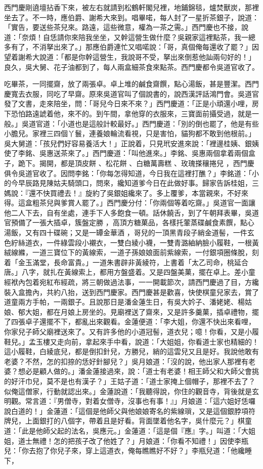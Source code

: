 西門慶剛遶壇拈香下來，被左右就請到松鶴軒閣兒裡，地鋪錦毯，爐焚獸炭，那裡坐去了。不一時，應伯爵、謝希大來到。唱畢喏，每人封了一星折茶銀子，說道：「實告，要送些茶兒來。路遠，這些微意，權為一茶之需。」西門慶也不接，說道：「奈煩！自恁請你來陪我坐坐，又幹這營生做什麼？吳親家這裡點茶，我一總多有了，不消拏出來了。」那應伯爵連忙又唱喏說：「哥，真個俺每還收了罷？」因望着謝希大說道：「都是你幹這營生，我說哥不受，拏出來倒惹他訕兩句好的！」良久，吳大舅、花子油都到了，每人兩盒細茶食來點茶。西門慶都令吳道官收了。

吃畢茶，一同擺齋，放了兩張卓。卓上堆的鹹食齋饌，點心湯飯，甚是豐潔。西門慶寬去衣服，同吃了早齋。原來吳道官叫了個說書的，說西漢評話鴻門會。吳道官發了文書，走來陪坐，問：「哥兒今日來不來？」西門慶道：「正是小頑還小哩，房下恐怕路遠諕着他，來不的。到午間，拿他穿的衣服來，三寶面前攝受過，就是一般。」吳道官道：「小道也是這般計較最好。」西門慶道：「別的倒也罷了，他是有些小膽兒。家裡三四個丫鬟，連養娘輪流看視，只是害怕，貓狗都不敢到他根前。」吳大舅道：「孩兒們好容易養活大！」正說着，只見玳安進來說：「裡邊桂姨、銀姨使了李銘、吳惠送茶來了。」西門慶道：「叫他進來。」李銘、吳惠兩個拿着兩個盒子，跪下。揭開，都是頂皮餅 、松花餅 、白糖萬壽糕 、玫瑰搽穰捲兒 ，西門慶俱令吳道官收了。因問李銘：「你每怎得知道，今日我在這裡打醮？」李銘道：「小的今早辰路見陳姑夫騎頭口，問來，纔知道爹今日在此做好事。歸家告訴桂姐，三媽說：『還不快買禮去！』旋約了吳銀姐纔來了。多上覆爹，本當親來，不好來得。這盒粗茶兒與爹賞人罷了。」西門慶分付：「你兩個等着吃齋。」吳道官一面讓他二人下去，自有坐處，連手下人多飽食一頓。話休饒舌，到了午朝拜表畢，吳道官預備了一張大插卓，簇盤定勝 ，高頂方糖菓品，各樣托葷蒸碟鹹食素饌，點心湯飯，又有四十碟碗；又是一罈金華酒 ，哥兒的一頂黑青段子綃金道髻，一件玄色紵絲道衣，一件綠雲段小襯衣，一雙白綾小襪，一雙青潞紬納臉小履鞋，一根黃絨線縧，一道三寶位下的黃線索，一道子孫娘娘面前紫線索，一付銀項圈條脫，刻着「金玉滿堂，長命富貴。」一道朱書辟非黃綾符，上書着「太乙司命，桃延合唐。」八字，就扎在黃線索上，都用方盤盛着。又是四盤美菓，擺在卓上。差小童經袱內包着宛紅布經疏，將三朝做過法事，一一開載節次，請西門慶過了目，方纔裝入盒擔內，共約八抬，送到西門慶家。西門慶甚是歡喜，快使棋童兒家去，賞了道童兩方手帕，一兩銀子。且說那日是潘金蓮生日，有吳大妗子、潘姥姥、楊姑娘、郁大姐，都在月娘上房坐的。見廟裡送了齋來，又是許多羹菓，插卓禮物，擺了四張卓子還擺不下，都亂出來觀看。金蓮便道：「李大姐，你還不快出來看哩，你家兒子師父廟裡送來了。又有許多他的小道冠髻，道衣兒；噫！你看，又是小履鞋兒。」孟玉樓又走向前，拿起來手中看，說道：「大姐姐，你看道士家也精細的！這小履鞋，白綾底兒，都是倒扣針兒，方勝兒，綃的這雲兒又且是好。我說他敢有老婆？不然，怎的扣捺的恁好針腳兒？」吳月娘道：「沒的說，他出家人那裡有老婆？想必是顧人做的。」潘金蓮接過來，說：「道士有老婆！相王師父和大師父會挑的好汗巾兒，莫不是也有漢子？」王姑子道：「道士家掩上個帽子，那裡不去了？似俺這僧家，行動就認出來。」金蓮說道：「我聽得說，你住的觀音寺，背後就是玄明觀。常言道：『男僧寺，對着女僧寺，沒事也有事！』」月娘道：「這六姐好恁囉說白道的！」金蓮道：「這個是他師父與他娘娘寄名的紫線瑣，又是這個銀脖項符牌兒，上面銀打的八個字，帶着且是好看。背面墜着他名字，吳什麼元？」棋童道：「此是他師父起的法名，吳應元。」金蓮道：「這是個『應』字。」叫道：「大姐姐，道士無禮！怎的把孩子改了他姓了？」月娘道：「你看不知禮！」因使李瓶兒：「你去抱了你兒子來，穿上這道衣，俺每瞧瞧好不好？」李瓶兒道：「他纔睡下，